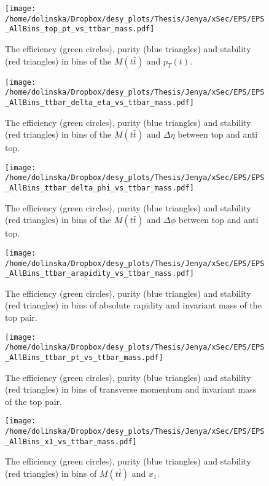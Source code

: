 \begin{figure}[p]
  \centering
  \texttt{[image: /home/dolinska/Dropbox/desy\_plots/Thesis/Jenya/xSec/EPS/EPS\_AllBins\_top\_pt\_vs\_ttbar\_mass.pdf]}
  \caption{The efficiency (green circles), purity (blue triangles) and stability (red triangles) in bins of the $M(t\bar{t})$ and $p_{T}(t)$.}
  \label{fig:EPS_2D_Mtt_pt}
\end{figure}

\begin{figure}[p]
  \centering
  \texttt{[image: /home/dolinska/Dropbox/desy\_plots/Thesis/Jenya/xSec/EPS/EPS\_AllBins\_ttbar\_delta\_eta\_vs\_ttbar\_mass.pdf]}
  \caption{The efficiency (green circles), purity (blue triangles) and stability (red triangles) in bins of the $M(t\bar{t})$ and $\Delta\eta$ between top and anti top.}
  \label{fig:EPS_2D_Mtt_eta}
\end{figure}

\begin{figure}[p]
  \centering
  \texttt{[image: /home/dolinska/Dropbox/desy\_plots/Thesis/Jenya/xSec/EPS/EPS\_AllBins\_ttbar\_delta\_phi\_vs\_ttbar\_mass.pdf]}
  \caption{The efficiency (green circles), purity (blue triangles) and stability (red triangles) in bins of the $M(t\bar{t})$ and $\Delta\phi$ between top and anti top.}
  \label{fig:EPS_2D_Mtt_phi}
\end{figure}

\begin{figure}[p]
  \centering
  \texttt{[image: /home/dolinska/Dropbox/desy\_plots/Thesis/Jenya/xSec/EPS/EPS\_AllBins\_ttbar\_arapidity\_vs\_ttbar\_mass.pdf]}
  \caption{The efficiency (green circles), purity (blue triangles) and stability (red triangles) in bins of absolute rapidity and invariant mass of the top pair.}
  \label{fig:EPS_2D_ytt_Mtt}
\end{figure}

\begin{figure}[p]
  \centering
  \texttt{[image: /home/dolinska/Dropbox/desy\_plots/Thesis/Jenya/xSec/EPS/EPS\_AllBins\_ttbar\_pt\_vs\_ttbar\_mass.pdf]}
  \caption{The efficiency (green circles), purity (blue triangles) and stability (red triangles) in bins of transverse momentum and invariant mass of the top pair.}
  \label{fig:EPS_2D_pttt_Mtt}
\end{figure}


\begin{figure}[p]
  \centering
  \texttt{[image: /home/dolinska/Dropbox/desy\_plots/Thesis/Jenya/xSec/EPS/EPS\_AllBins\_x1\_vs\_ttbar\_mass.pdf]}
  \caption{The efficiency (green circles), purity (blue triangles) and stability (red triangles) in bins of $M(t\bar{t})$ and  $x_{1}$.}
  \label{fig:EPS_2D_Mtt_x1}
\end{figure}